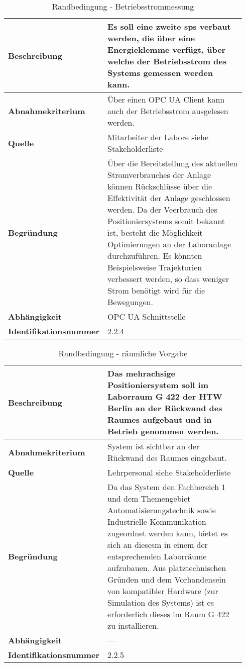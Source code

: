 \documentclass[../Bachelorarbeit.tex]{subfiles}
\begin{document}
\begin{table}[H]
    \centering
    \begin{tabular}{| p{0.34\linewidth} | p{0.6\linewidth} |}
        \hline
        \textbf{Beschreibung} & Es soll eine zweite \acs{sps} verbaut werden, die über eine Energieklemme verfügt, über welche der Betriebsstrom des Systems gemessen werden kann. \\ \hline
        \textbf{Abnahmekriterium} & Über einen OPC UA Client kann auch der Betriebsstrom ausgelesen werden. \\ \hline
        \textbf{Quelle} & Mitarbeiter der Labore siehe Stakeholderliste \\ \hline
        \textbf{Begründung} & Über die Bereitstellung des aktuellen Stromverbrauches der Anlage können Rückschlüsse über die Effektivität der Anlage geschlossen werden. Da der Veerbrauch des Positioniersystems somit bekannt ist, besteht die Möglichkeit Optimierungen an der Laboranlage durchzuführen. Es könnten Beispielsweise Trajektorien verbessert werden, so dass weniger Strom benötigt wird für die Bewegungen. \\ \hline
        \textbf{Abhängigkeit} & OPC UA Schnittstelle \\ \hline
        \textbf{Identifikationsnummer} & 2.2.4 \\ \hline
    \end{tabular}
    \caption[\acs{nfa} - Betriebsstrommessung]{Randbedingung - Betriebsstrommessung}
    \label{tab:my-table24}
\end{table}

\begin{table}[H]
    \centering
    \begin{tabular}{| p{0.34\linewidth} | p{0.6\linewidth} |}
        \hline
        \textbf{Beschreibung} & Das mehrachsige Positioniersystem soll im Laborraum G 422 der HTW Berlin an der Rückwand des Raumes aufgebaut und in Betrieb genommen werden. \\ \hline
        \textbf{Abnahmekriterium} & System ist sichtbar an der Rückwand des Raumes eingebaut. \\ \hline
        \textbf{Quelle} & Lehrpersonal siehe Stakeholderliste \\ \hline
        \textbf{Begründung} & Da das System den Fachbereich 1 und dem Themengebiet Automatisierungstechnik sowie Industrielle Kommunikation zugeordnet werden kann, bietet es sich an diesesm in einem der entsprechenden Laborräume aufzubauen. Aus platztechnischen Gründen und dem Vorhandensein von kompatibler Hardware (zur Simulation des Systems) ist es erforderlich dieses im Raum G 422 zu installieren. \\ \hline
        \textbf{Abhängigkeit} & -\xspace -\xspace - \\ \hline
        \textbf{Identifikationsnummer} & 2.2.5 \\ \hline
    \end{tabular}
    \caption[\acs{nfa} - räumliche Vorgabe]{Randbedingung - räumliche Vorgabe}
    \label{tab:my-table25}
\end{table}
\end{document}
